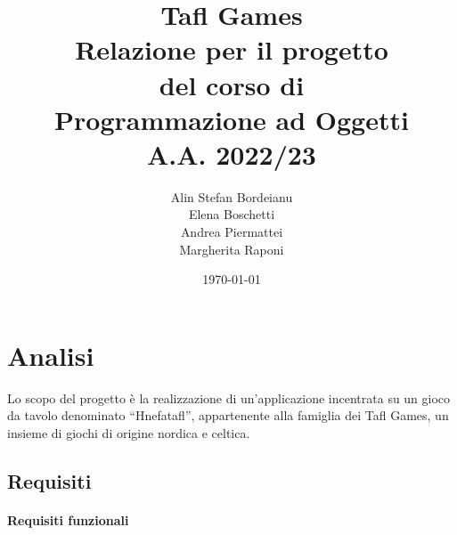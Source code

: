 \documentclass[a4paper,12pt]{report}
\title{Tafl Games\\\large Relazione per il progetto \\ del corso di \\ Programmazione ad Oggetti \\ A.A. 2022/23}
\author{Alin Stefan Bordeianu \\ Elena Boschetti \\ Andrea Piermattei \\ Margherita Raponi}
\date{\today}
\begin{document}
\maketitle

\tableofcontents

\chapter{Analisi}

Lo scopo del progetto è la realizzazione di un'applicazione incentrata su un gioco da tavolo denominato “Hnefatafl”, appartenente alla famiglia dei Tafl Games, un insieme di giochi di origine nordica e celtica. 

\section{Requisiti}

\subsubsection{Requisiti funzionali}
\end{document}
